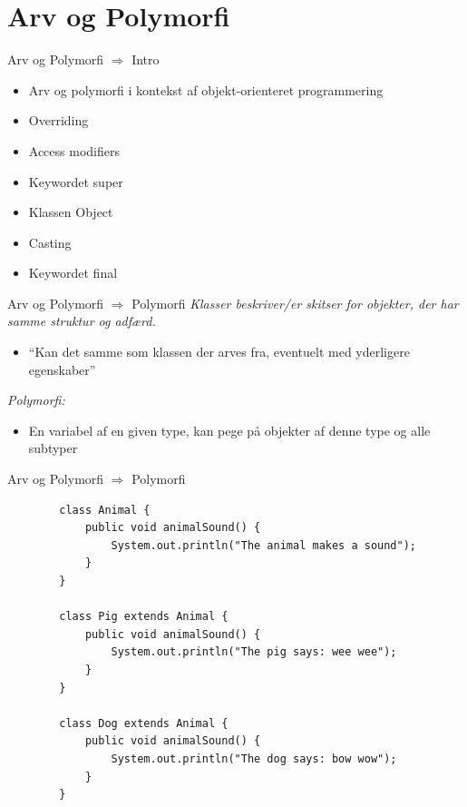 \documentclass[10pt,aspectratio=1610]{beamer}
\begin{document}
\section{Arv og Polymorfi}
\begin{frame}{Arv og Polymorfi $\Rightarrow$ Intro}
    \begin{itemize}
        \item Arv og polymorfi i kontekst af objekt-orienteret programmering
        \item Overriding
        \item Access modifiers
        \item Keywordet super
        \item Klassen Object
        \item Casting 
        \item Keywordet final
    \end{itemize}
\end{frame}


\begin{frame}{Arv og Polymorfi $\Rightarrow$ Polymorfi}
    \textit{Klasser beskriver/er skitser for objekter, der har samme struktur og adfærd.}
    \begin{itemize}
        \item “Kan det samme som klassen der arves fra, eventuelt med yderligere egenskaber”
    \end{itemize}
    \textit{Polymorfi:}
    \begin{itemize}
        \item En variabel af en given type, kan pege på objekter af denne type og alle subtyper
    \end{itemize}
\end{frame}

\begin{frame}[fragile]{Arv og Polymorfi $\Rightarrow$ Polymorfi}
    \begin{lstlisting}
        class Animal {
            public void animalSound() {
                System.out.println("The animal makes a sound");
            }
        }
        
        class Pig extends Animal {
            public void animalSound() {
                System.out.println("The pig says: wee wee");
            }
        }
        
        class Dog extends Animal {
            public void animalSound() {
                System.out.println("The dog says: bow wow");
            }
        }
    \end{lstlisting}
\end{frame}
\end{document}
